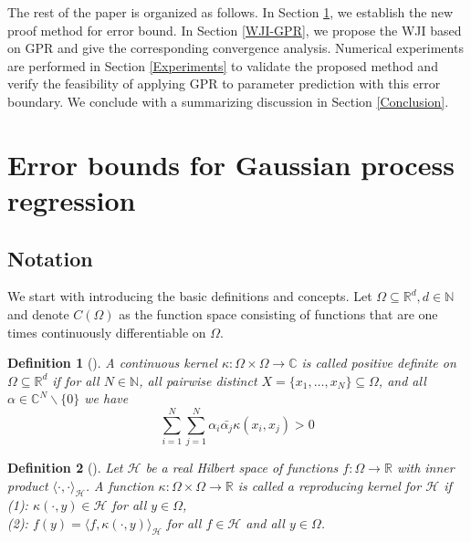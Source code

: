 \documentclass[preprint,review,sort&compress,3p]{elsarticle}
\newtheorem{dnt}{Definition}[section]
\begin{document}
The rest of the paper is organized as follows. In Section \ref{sec:error_bounds}, we establish the new proof method for error bound. In Section \ref{WJI-GPR}, we propose the  WJI based on GPR and give the corresponding convergence analysis.  Numerical experiments are performed in Section \ref{Experiments} to validate the proposed method and verify the feasibility of applying GPR to parameter prediction with this error boundary. We conclude with a summarizing discussion in Section \ref{Conclusion}.



\section{Error bounds for Gaussian process regression}\label{sec:error_bounds}
\subsection{Notation}
We start with introducing the basic definitions and concepts.
Let $\Omega \subseteq \mathbb{R}^d, d\in \mathbb{N}$ and denote $C(\Omega)$ as the function space consisting of functions that are one times continuously differentiable on $\Omega$.


\begin{dnt}[\cite{P-A-R-M-2004}] 
	A continuous kernel $\kappa: \Omega \times \Omega \rightarrow \mathbb{C}$ is called positive definite on $\Omega \subseteq \mathbb{R}^d$ if for all $N \in \mathbb{N}$, all pairwise distinct $X = \{x_1,\dots,x_N\}\subseteq \Omega$, and all $\alpha\in \mathbb{C}^N \backslash\{0\}$ we have 
	$$
	\sum\limits_{i=1}^N \sum\limits_{j=1}^N \alpha_i \bar{\alpha_j} \kappa(x_i,x_j) >0
	$$
\end{dnt}

\begin{dnt}[\cite{P-A-R-M-2004}] Let $\mathcal{H}$ be a real Hilbert space of functions $f: \Omega\rightarrow\mathbb{R}$ with inner product $\langle\cdot,\cdot\rangle_\mathcal{H}$. A function $\kappa: \Omega\times \Omega \rightarrow \mathbb{R}$ is called a reproducing kernel for $\mathcal{H}$ if \\
	(1): $\kappa(\cdot,y)\in \mathcal{H}$ for all $y\in \Omega$, \\
	(2): $f(y) = \langle f,\kappa(\cdot,y)\rangle_\mathcal{H}$ for all $f \in \mathcal{H}$ and all $y\in \Omega$. 
\end{dnt}
\end{document}
